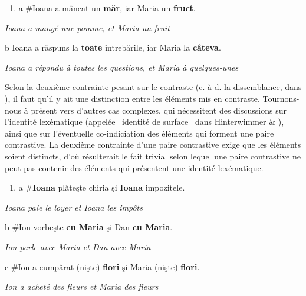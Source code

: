\begin{enumerate}
\item \label{bkm:Ref289597573}a  \#Ioana a mâncat un\textbf{ măr}, iar Maria un\textbf{ fruct}.


\end{enumerate}
    \textit{Ioana a mangé une pomme, et Maria un fruit } 

  b  Ioana a răspuns la \textbf{toate} întrebările, iar Maria la \textbf{câteva}. 

    \textit{Ioana a répondu à toutes les questions, et Maria à quelques-unes}

Selon la deuxième contrainte pesant sur le contraste (c.-à-d. la dissemblance, dans \citet{Umbach2005}), il faut qu'il y ait une distinction entre les éléments mis en contraste. Tournons-nous à présent vers d'autres cas complexes, qui nécessitent des discussions sur l'identité lexématique (appelée {\guillemotleft}~identité de surface~{\guillemotright} dans Hinterwimmer \& \citet{Repp2008}), ainsi que sur l'éventuelle co-indiciation des éléments qui forment une paire contrastive. La deuxième contrainte d'une paire contrastive exige que les éléments soient distincts, d'où résulterait le fait trivial selon lequel une paire contrastive ne peut pas contenir des éléments qui présentent une identité lexématique. 


\begin{enumerate}
\item \label{bkm:Ref289551900}a  \#\textbf{Ioana} plăteşte chiria şi \textbf{Ioana} impozitele.


\end{enumerate}
{\itshape
Ioana paie le loyer et Ioana les impôts } 

  b  \#Ion vorbeşte \textbf{cu Maria} şi Dan \textbf{cu Maria}. 

    \textit{Ion parle avec Maria et Dan avec Maria}

  c  \#Ion a cumpărat (nişte) \textbf{flori} şi Maria (nişte) \textbf{flori}. 

    \textit{Ion a acheté des fleurs et Maria des fleurs } 

